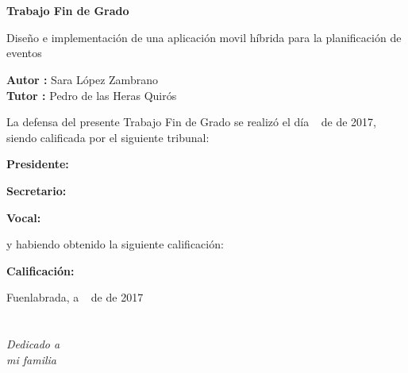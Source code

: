 \documentclass[a4paper, 12pt]{book}
\begin{document}
\newpage
\mbox{}
\thispagestyle{empty} %


\clearpage
{}
\chapter*{}

\vspace{-4cm}
\begin{center}
\LARGE
\textbf{Trabajo Fin de Grado}

\vspace{1cm}
\large
Dise\~no e implementaci\'on de una aplicaci\'on movil h\'ibrida para la planificaci\'on de eventos 


\vspace{1cm}
\large
\textbf{Autor :} Sara L\'opez Zambrano \\
\textbf{Tutor :} Pedro de las Heras Quir\'os

\end{center}

\vspace{1cm}
La defensa del presente Trabajo Fin de Grado se realiz\'o el d\'ia \qquad$\;\,$ de \qquad\qquad\qquad\qquad \newline de 2017, siendo calificada por el siguiente tribunal:


\vspace{0.5cm}
\textbf{Presidente:}

\vspace{1.2cm}
\textbf{Secretario:}

\vspace{1.2cm}
\textbf{Vocal:}


\vspace{1.2cm}
y habiendo obtenido la siguiente calificaci\'on:

\vspace{1cm}
\textbf{Calificaci\'on:}


\vspace{1cm}
\begin{flushright}
Fuenlabrada, a \qquad$\;\,$ de \qquad\qquad\qquad\qquad de 2017
\end{flushright}


\chapter*{}
\begin{flushright}
\textit{Dedicado a \\
mi familia}
\end{flushright}
\end{document}
